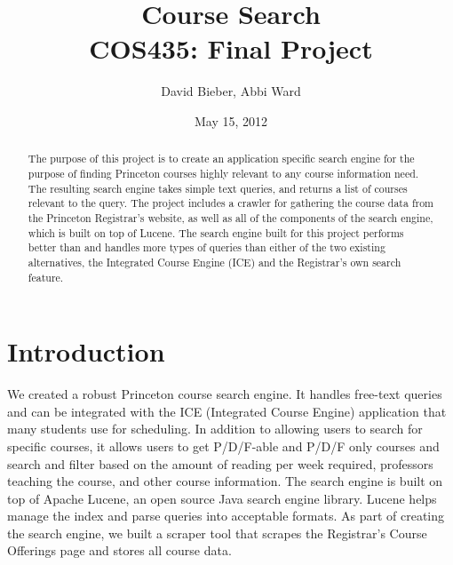 \documentclass[12pt,letterpaper]{article}
\begin{document}
\title{Course Search \\ \large{COS435: Final Project}}
\author{David Bieber, Abbi Ward}
\date{May 15, 2012}

\null  %
\nointerlineskip  %
\vfill
\let\snewpage \newpage
\let\newpage \relax
\maketitle
\let \newpage \snewpage
\vfill 
\break %

\newpage

\begin{abstract}
The purpose of this project is to create an application specific search engine for the purpose of finding Princeton courses highly relevant to any course information need.
The resulting search engine takes simple text queries, and returns a list of courses relevant to the query. The project includes a crawler for gathering the course data from the Princeton Registrar's website, as well as all of the components of the search engine, which is built on top of Lucene.
The search engine built for this project performs better than and handles more types of queries than either of the two existing alternatives, the Integrated Course Engine (ICE) and the Registrar's own search feature.
\end{abstract}

\section{Introduction}
We created a robust Princeton course search engine. It handles free-text queries and can be integrated with the ICE (Integrated Course Engine) application that many students use for scheduling.
In addition to allowing users to search for specific courses, it allows users to get P/D/F-able and P/D/F only courses and search and filter based on the amount of reading per week required, professors teaching the course, and other course information.
The search engine is built on top of Apache Lucene, an open source Java search engine library. Lucene helps manage the index and parse queries into acceptable formats.
As part of creating the search engine, we built a scraper tool that scrapes the Registrar's Course Offerings page and stores all course data.
\end{document}
